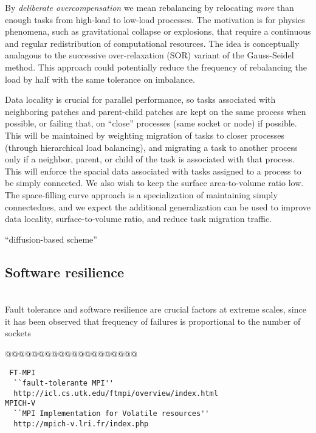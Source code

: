\documentclass{article}
\begin{document}
%
By \textit{deliberate overcompensation} we mean rebalancing by
relocating \textit{more} than enough tasks from high-load to low-load
processes.  The motivation is for physics phenomena, such as
gravitational collapse or explosions, that require a continuous and
regular redistribution of computational resources.  The idea is
conceptually analagous to the successive over-relaxation (SOR) variant
of the Gauss-Seidel method.  This approach could potentially reduce
the frequency of rebalancing the load by half with the same tolerance
on imbalance.

%
Data locality is crucial for parallel performance, so tasks associated
with neighboring patches and parent-child patches are kept on the same
process when possible, or failing that, on ``close'' processes (same
socket or node) if possible.  This will be maintained by weighting
migration of tasks to closer processes (through hierarchical load
balancing), and migrating a task to another process only if a
neighbor, parent, or child of the task is associated with that
process.  This will enforce the spacial data associated with tasks
assigned to a process to be simply connected.  We also wish to keep
the surface area-to-volume ratio low.  The space-filling curve
approach is a specialization of maintaining simply connectednes, and
we expect the additional generalization can be used to improve data
locality, surface-to-volume ratio, and reduce task migration traffic.

``diffusion-based scheme''

\subsection{Software resilience} \label{ss:design-resilience}

\ \\  Fault tolerance and software
resilience are crucial factors at extreme scales, since it has been
observed that frequency of failures is proportional to the number of
sockets~\cite{@@@}

@@@@@@@@@@@@@@@@@@@@

\begin{verbatim}
 FT-MPI 
  ``fault-tolerante MPI''
  http://icl.cs.utk.edu/ftmpi/overview/index.html 
MPICH-V 
  ``MPI Implementation for Volatile resources''
  http://mpich-v.lri.fr/index.php 
\end{verbatim}
\end{document}
